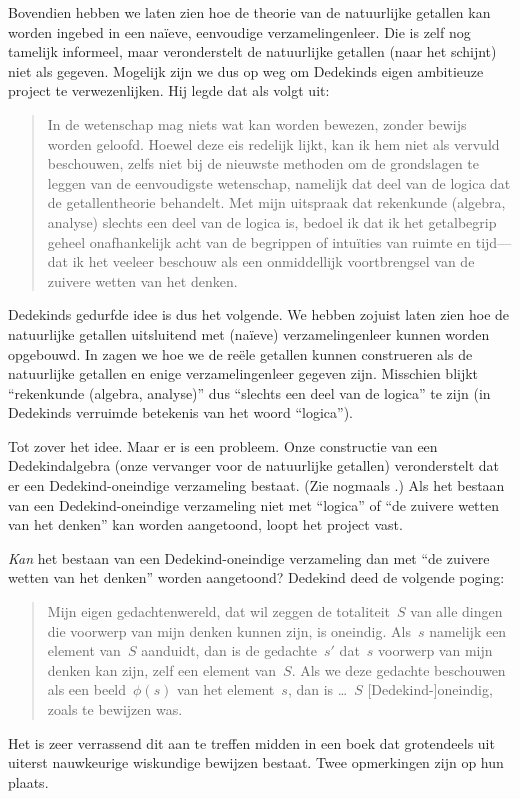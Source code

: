\documentclass[openany]{memoir}
\begin{document}
Bovendien hebben we laten zien hoe de theorie van de natuurlijke
getallen kan worden ingebed in een na\"ieve, eenvoudige
verzamelingenleer. Die is zelf nog tamelijk informeel, maar
veronderstelt de natuurlijke getallen (naar het schijnt) niet als
gegeven. Mogelijk zijn we dus op weg om Dedekinds eigen ambitieuze
project te verwezenlijken. Hij legde dat als volgt uit:
\begin{quote}
	In de wetenschap mag niets wat kan worden bewezen, zonder bewijs
	worden geloofd. Hoewel deze eis redelijk lijkt, kan ik hem niet als
	vervuld beschouwen, zelfs niet bij de nieuwste methoden om de
	grondslagen te leggen van de eenvoudigste wetenschap, namelijk dat
	deel van de logica dat de getallentheorie behandelt. Met mijn
	uitspraak dat rekenkunde (algebra, analyse) slechts een deel van de
	logica is, bedoel ik dat ik het getalbegrip geheel onafhankelijk acht
	van de begrippen of intuïties van ruimte en tijd---dat ik het veeleer
	beschouw als een onmiddellijk voortbrengsel van de zuivere wetten van
	het denken.
	\citep[voorwoord]{Dedekind1888}
\end{quote}
Dedekinds gedurfde idee is dus het volgende. We hebben zojuist laten
zien hoe de natuurlijke getallen uitsluitend met (na\"ieve)
verzamelingenleer kunnen worden opgebouwd. In
 zagen we hoe we de reële getallen kunnen
construeren als de natuurlijke getallen en enige verzamelingenleer
gegeven zijn. Misschien blijkt ``rekenkunde (algebra, analyse)'' dus
``slechts een deel van de logica'' te zijn (in Dedekinds verruimde
betekenis van het woord ``logica'').

Tot zover het idee. Maar er is een probleem. Onze constructie van een
Dedekindalgebra (onze vervanger voor de natuurlijke getallen)
veronderstelt dat er een Dedekind-oneindige verzameling bestaat. (Zie
nogmaals
.) Als het
bestaan van een Dedekind-oneindige verzameling niet met ``logica'' of
``de zuivere wetten van het denken'' kan worden aangetoond, loopt het
project vast.

\emph{Kan} het bestaan van een Dedekind-oneindige verzameling dan met
``de zuivere wetten van het denken'' worden aangetoond? Dedekind deed de
volgende poging:
\begin{quote}
  Mijn eigen gedachtenwereld, dat wil zeggen de totaliteit~$S$ van alle
  dingen die voorwerp van mijn denken kunnen zijn, is oneindig. Als~$s$
  namelijk een element van~$S$ aanduidt, dan is de gedachte~$s'$ dat~$s$
  voorwerp van mijn denken kan zijn, zelf een element van~$S$. Als we
  deze gedachte beschouwen als een beeld~$\phi(s)$ van het element~$s$,
  dan is \dots~$S$ [Dedekind-]oneindig, zoals te bewijzen was.
	\citep[\S66]{Dedekind1888}
\end{quote}
Het is zeer verrassend dit aan te treffen midden in een boek dat
grotendeels uit uiterst nauwkeurige wiskundige bewijzen bestaat. Twee
opmerkingen zijn op hun plaats.
\end{document}
